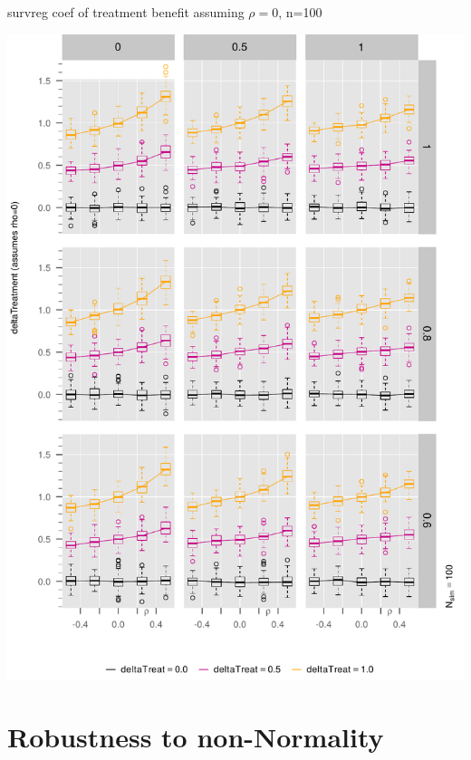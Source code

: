 \documentclass[10pt]{beamer}
\begin{document}
\begin{frame}{survreg coef of treatment benefit assuming $\rho=0$, n=100}

\begin{center}
  \includegraphics[width=1.00\textwidth]{Figure3/mayplot-coefTreat-n100-v2.pdf} %
\end{center}

\end{frame}


\hypertarget{robustness-to-non-normality}{%
\section{Robustness to non-Normality}\label{robustness-to-non-normality}}
\end{document}
